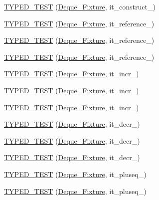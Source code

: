 \begin{DoxyCompactItemize}
\item 
\hyperlink{TestDeque_8c_09_09_a7c0549005375475fc054437d56e8881a}{T\-Y\-P\-E\-D\-\_\-\-T\-E\-S\-T} (\hyperlink{structDeque__Fixture}{Deque\-\_\-\-Fixture}, it\-\_\-construct\-\_)
\item 
\hyperlink{TestDeque_8c_09_09_a600054a17e2ed332fbb5a788be24b6b2}{T\-Y\-P\-E\-D\-\_\-\-T\-E\-S\-T} (\hyperlink{structDeque__Fixture}{Deque\-\_\-\-Fixture}, it\-\_\-reference\-\_)
\item 
\hyperlink{TestDeque_8c_09_09_aa460c2d7fc742f18c9501561e3f507ae}{T\-Y\-P\-E\-D\-\_\-\-T\-E\-S\-T} (\hyperlink{structDeque__Fixture}{Deque\-\_\-\-Fixture}, it\-\_\-reference\-\_)
\item 
\hyperlink{TestDeque_8c_09_09_a523a979dce81e7853360ae8c6f9020f7}{T\-Y\-P\-E\-D\-\_\-\-T\-E\-S\-T} (\hyperlink{structDeque__Fixture}{Deque\-\_\-\-Fixture}, it\-\_\-reference\-\_)
\item 
\hyperlink{TestDeque_8c_09_09_aa0f27565f6de3c064547c23e9b3cb16f}{T\-Y\-P\-E\-D\-\_\-\-T\-E\-S\-T} (\hyperlink{structDeque__Fixture}{Deque\-\_\-\-Fixture}, it\-\_\-incr\-\_)
\item 
\hyperlink{TestDeque_8c_09_09_ab64f72eaca3bfae9fb740909d6f19f68}{T\-Y\-P\-E\-D\-\_\-\-T\-E\-S\-T} (\hyperlink{structDeque__Fixture}{Deque\-\_\-\-Fixture}, it\-\_\-incr\-\_)
\item 
\hyperlink{TestDeque_8c_09_09_afb7299835111dbb636bf95e0acd71d14}{T\-Y\-P\-E\-D\-\_\-\-T\-E\-S\-T} (\hyperlink{structDeque__Fixture}{Deque\-\_\-\-Fixture}, it\-\_\-incr\-\_)
\item 
\hyperlink{TestDeque_8c_09_09_a7fb7c5d91a7df241754eab9ac5ae7a8a}{T\-Y\-P\-E\-D\-\_\-\-T\-E\-S\-T} (\hyperlink{structDeque__Fixture}{Deque\-\_\-\-Fixture}, it\-\_\-decr\-\_)
\item 
\hyperlink{TestDeque_8c_09_09_ae5a9b9f8adf6d50cbbdb9bb64153fca8}{T\-Y\-P\-E\-D\-\_\-\-T\-E\-S\-T} (\hyperlink{structDeque__Fixture}{Deque\-\_\-\-Fixture}, it\-\_\-decr\-\_)
\item 
\hyperlink{TestDeque_8c_09_09_a103ed9a061bba5f9af28db0c3ec6a798}{T\-Y\-P\-E\-D\-\_\-\-T\-E\-S\-T} (\hyperlink{structDeque__Fixture}{Deque\-\_\-\-Fixture}, it\-\_\-decr\-\_)
\item 
\hyperlink{TestDeque_8c_09_09_a1b3ae0b23aa9a588ec0d73b365418d2f}{T\-Y\-P\-E\-D\-\_\-\-T\-E\-S\-T} (\hyperlink{structDeque__Fixture}{Deque\-\_\-\-Fixture}, it\-\_\-pluseq\-\_)
\item 
\hyperlink{TestDeque_8c_09_09_a68747d92e55b6f3f8064843860d5612c}{T\-Y\-P\-E\-D\-\_\-\-T\-E\-S\-T} (\hyperlink{structDeque__Fixture}{Deque\-\_\-\-Fixture}, it\-\_\-pluseq\-\_)

\end{DoxyCompactItemize}
